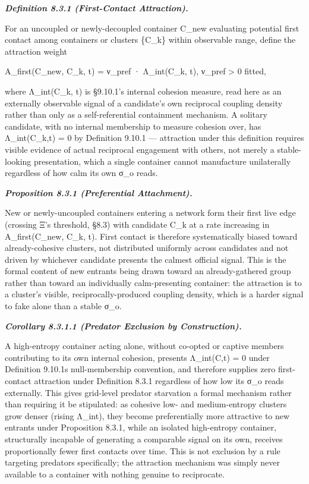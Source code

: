 \documentclass[
]{article}
\begin{document}
\emph{\textbf{Definition 8.3.1 (First-Contact Attraction).}}

For an uncoupled or newly-decoupled container C\_new evaluating
potential first contact among containers or clusters \{C\_k\} within
observable range, define the attraction weight

A\_first(C\_new, C\_k, t) = ν\_pref · Λ\_int(C\_k, t), ν\_pref
\textgreater{} 0 fitted,

where Λ\_int(C\_k, t) is §9.10.1's internal cohesion measure, read here
as an externally observable signal of a candidate's own reciprocal
coupling density rather than only as a self-referential containment
mechanism. A solitary candidate, with no internal membership to measure
cohesion over, has Λ\_int(C\_k,t) = 0 by Definition 9.10.1 ---
attraction under this definition requires visible evidence of actual
reciprocal engagement with others, not merely a stable-looking
presentation, which a single container cannot manufacture unilaterally
regardless of how calm its own σ\_o reads.

\emph{\textbf{Proposition 8.3.1 (Preferential Attachment).}}

New or newly-uncoupled containers entering a network form their first
live edge (crossing Ξ's threshold, §8.3) with candidate C\_k at a rate
increasing in A\_first(C\_new, C\_k, t). First contact is therefore
systematically biased toward already-cohesive clusters, not distributed
uniformly across candidates and not driven by whichever candidate
presents the calmest official signal. This is the formal content of new
entrants being drawn toward an already-gathered group rather than toward
an individually calm-presenting container: the attraction is to a
cluster's visible, reciprocally-produced coupling density, which is a
harder signal to fake alone than a stable σ\_o.

\emph{\textbf{Corollary 8.3.1.1 (Predator Exclusion by Construction).}}

A high-entropy container acting alone, without co-opted or captive
members contributing to its own internal cohesion, presents Λ\_int(C,t)
= 0 under Definition 9.10.1s null-membership convention, and therefore
supplies zero first-contact attraction under Definition 8.3.1 regardless
of how low its σ\_o reads externally. This gives grid-level predator
starvation a formal mechanism rather than requiring it be stipulated: as
cohesive low- and medium-entropy clusters grow denser (rising Λ\_int),
they become preferentially more attractive to new entrants under
Proposition 8.3.1, while an isolated high-entropy container,
structurally incapable of generating a comparable signal on its own,
receives proportionally fewer first contacts over time. This is not
exclusion by a rule targeting predators specifically; the attraction
mechanism was simply never available to a container with nothing genuine
to reciprocate.
\end{document}
